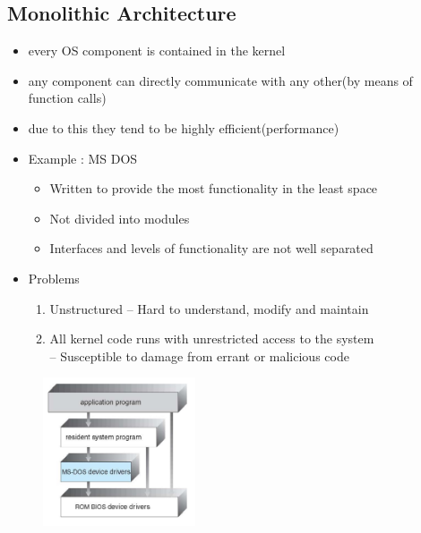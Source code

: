 \documentclass[11pt]{article}
\theoremstyle{definition}
\begin{document}
    \subsection{Monolithic Architecture}
        \begin{itemize}
            \item every OS component is contained in the kernel
            \item any component can directly communicate with any other(by means of function calls)
            \item due to this they tend to be highly efficient(performance)
            \item Example : MS DOS
                \begin{itemize}
                    \item Written to provide the most functionality in the least space
                    \item Not divided into modules
                    \item Interfaces and levels of functionality are not well separated
                \end{itemize}
            \item Problems
             \begin{enumerate}
                 \item Unstructured -- Hard to understand, modify and maintain
                 \item All kernel code runs with unrestricted access to the system \\-- Susceptible to damage from errant or malicious code 
             \end{enumerate}
        
             
        \end{itemize}

        \begin{figure}[h]
    \centering
    \includegraphics[width=0.4\textwidth]{img/MS_DOS.jpg} 
    \label{fig:a}
\end{figure}
\end{document}

